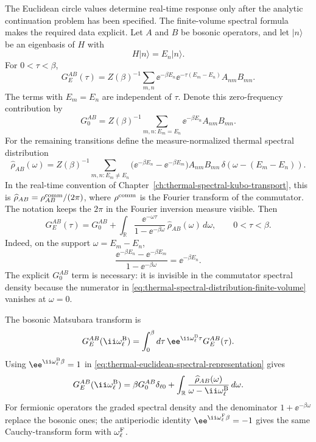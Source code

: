 The Euclidean circle values determine real-time response only after the
analytic continuation problem has been specified.  The finite-volume spectral
formula makes the required data explicit.  Let \(A\) and \(B\) be bosonic
operators, and let \(|n\rangle\) be an eigenbasis of \(H\) with
\[
  H|n\rangle=E_n|n\rangle .
\]
For \(0<\tau<\beta\),
\[
  G_E^{AB}(\tau)
  =
  Z(\beta)^{-1}
  \sum_{m,n}
  \ee^{-\beta E_n}
  \ee^{-\tau(E_m-E_n)}
  A_{nm}B_{mn}.
\]
The terms with \(E_m=E_n\) are independent of \(\tau\).  Denote this
zero-frequency contribution by
\[
  G^{AB}_0
  =
  Z(\beta)^{-1}
  \sum_{m,n:E_m=E_n}
  \ee^{-\beta E_n}A_{nm}B_{mn}.
\]
For the remaining transitions define the measure-normalized thermal spectral
distribution
\begin{equation}
  \widehat\rho_{AB}(\omega)
  =
  Z(\beta)^{-1}
  \sum_{m,n:E_m\neq E_n}
  \bigl(\ee^{-\beta E_n}-\ee^{-\beta E_m}\bigr)
  A_{nm}B_{mn}\,
  \delta(\omega-(E_m-E_n)).
  \label{eq:thermal-spectral-distribution-finite-volume}
\end{equation}
In the real-time convention of
Chapter~\ref{ch:thermal-spectral-kubo-transport}, this is
\(\widehat\rho_{AB}=\rho^{\rm comm}_{AB}/(2\pi)\), where
\(\rho^{\rm comm}\) is the Fourier transform of the commutator.  The notation
keeps the \(2\pi\) in the Fourier inversion measure visible.
Then
\begin{equation}
  G_E^{AB}(\tau)
  =
  G^{AB}_0+
  \int_{\mathbb R}
  \frac{\ee^{-\omega\tau}}{1-\ee^{-\beta\omega}}\,
  \widehat\rho_{AB}(\omega)\,d\omega ,
  \qquad 0<\tau<\beta .
  \label{eq:thermal-euclidean-spectral-representation}
\end{equation}
Indeed, on the support \(\omega=E_m-E_n\),
\[
  \frac{\ee^{-\beta E_n}-\ee^{-\beta E_m}}
       {1-\ee^{-\beta\omega}}
  =
  \ee^{-\beta E_n}.
\]
The explicit \(G^{AB}_0\) term is necessary: it is invisible in the
commutator spectral density because the numerator in
\eqref{eq:thermal-spectral-distribution-finite-volume} vanishes at
\(\omega=0\).

The bosonic Matsubara transform is
\[
  G_E^{AB}(\ii\omega_\ell^{\rm B})
  =
  \int_0^\beta d\tau\,
  \ee^{\ii\omega_\ell^{\rm B}\tau}
  G_E^{AB}(\tau).
\]
Using \(\ee^{\ii\omega_\ell^{\rm B}\beta}=1\) in
\eqref{eq:thermal-euclidean-spectral-representation} gives
\begin{equation}
  G_E^{AB}(\ii\omega_\ell^{\rm B})
  =
  \beta G^{AB}_0\delta_{\ell 0}
  +
  \int_{\mathbb R}
  \frac{\widehat\rho_{AB}(\omega)}
       {\omega-\ii\omega_\ell^{\rm B}}\,d\omega .
  \label{eq:matsubara-spectral-transform}
\end{equation}
For fermionic operators the graded spectral density and the denominator
\(1+\ee^{-\beta\omega}\) replace the bosonic ones; the antiperiodic identity
\(\ee^{\ii\omega_\ell^{\rm F}\beta}=-1\) gives the same Cauchy-transform
form with \(\omega_\ell^{\rm F}\).

